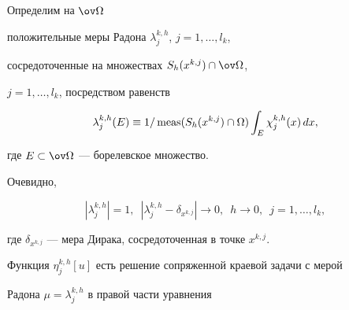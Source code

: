 




Определим на $\ov\Omega$


положительные меры Радона $\lambda_j^{k,h}$, $j=1,\dotsc,l_k$,


сосредоточенные на множествах $S_h(x^{k,j})\cap\ov\Omega$,


$j=1,\dotsc,l_k$, посредством равенств


$$


\lambda_j^{k,h}(E)\equiv1/\meas(S_h(x^{k,j})\cap\Omega)


\int_E\chi^{k,h}_j(x)\,dx,


$$


где $E\subset\ov\Omega$ --- борелевское множество.


Очевидно,


\begin{equation}\label{9dis1_3_1}


|\lambda_j^{k,h}|=1,\ \; |\lambda_j^{k,h}-\delta_{x^{k,j}}|\to


0,\ \; h\to 0,\ \; j=1,\dotsc,l_k,


\end{equation}


где $\delta_{x^{k,j}}$ --- мера Дирака, сосредоточенная в точке $x^{k,j}$.


Функция $\eta_j^{k,h}[u]$ есть решение сопряженной краевой задачи с мерой


Радона $\mu=\lambda_j^{k,h}$ в правой части уравнения


